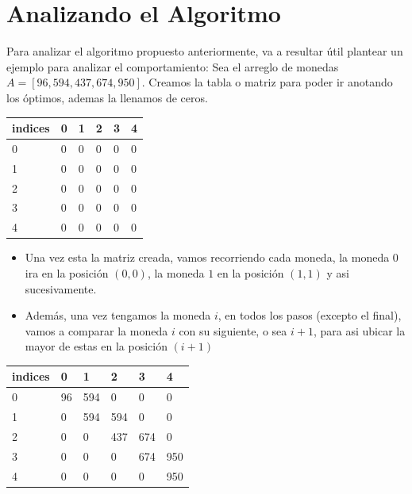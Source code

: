 \section{Analizando el Algoritmo}

Para analizar el algoritmo propuesto anteriormente, va a resultar útil plantear un ejemplo para analizar el comportamiento:
Sea el arreglo de monedas $A = [96, 594, 437, 674, 950]$.
Creamos la tabla o matriz para poder ir anotando los óptimos, ademas la llenamos de ceros.

\begin{table}[H]
    \centering
    \begin{tabular}{|l|l|l|l|l|l|}
    \hline
        indices & 0 & 1 & 2 & 3 & 4 \\ \hline
        0 & 0 & 0 & 0 & 0 & 0 \\ \hline
        1 & 0 & 0 & 0 & 0 & 0 \\ \hline
        2 & 0 & 0 & 0 & 0 & 0 \\ \hline
        3 & 0 & 0 & 0 & 0 & 0 \\ \hline
        4 & 0 & 0 & 0 & 0 & 0 \\ \hline
    \end{tabular}
\end{table}
\begin{itemize}
    \item Una vez esta la matriz creada, vamos recorriendo cada moneda, la moneda $0$ ira en la posición $(0, 0)$, la moneda $1$ en la posición $(1, 1)$ y asi sucesivamente.
    \item Además, una vez tengamos la moneda $i$, en todos los pasos (excepto el final), vamos a comparar la moneda $i$ con su siguiente, o sea $i+1$, para asi ubicar la mayor de estas en la posición $(i+1)$
\end{itemize}
\begin{table}[H]
    \centering
    \begin{tabular}{|l|l|l|l|l|l|}
    \hline
        indices & 0 & 1 & 2 & 3 & 4 \\ \hline
        0 & 96 & 594 & 0 & 0 & 0 \\ \hline
        1 & 0 & 594 & 594 & 0 & 0 \\ \hline
        2 & 0 & 0 & 437 & 674 & 0 \\ \hline
        3 & 0 & 0 & 0 & 674 & 950 \\ \hline
        4 & 0 & 0 & 0 & 0 & 950 \\ \hline
    \end{tabular}
\end{table}
